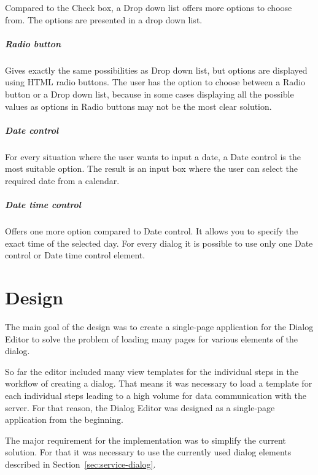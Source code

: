 Compared to the Check box, a Drop down list offers more options to choose from.
The options are presented in a drop down list.

\paragraph{Radio button}

Gives exactly the same possibilities as Drop down list, but options are
displayed using HTML radio buttons. The user has the option to choose
between a Radio button or a Drop down list, because in some cases displaying all
the possible values as options in Radio buttons may not be the most clear
solution.

\paragraph{Date control}

For every situation where the user wants to input a date, a Date control is
the most suitable option. The result is an input box where the user can
select the required date from a calendar.

\paragraph{Date time control}\label{subsub:datetime}

Offers one more option compared to Date control. It allows you to specify the
exact time of the selected day.
For every dialog it is possible to use only one Date control or
Date time control element.

\chapter{Design}\label{ch:design}

The main goal of the design was to create a single-page application for the
Dialog Editor to solve the problem of loading many pages for various elements
of the dialog.

So far the editor included many view templates for the individual steps in the
workflow of creating a dialog. That means it was necessary to load a template
for each individual steps leading to a high volume for data communication
with the server. For that reason, the Dialog Editor was designed as
a single-page application from the beginning.

The major requirement for the implementation was to simplify the current
solution. For that it was necessary to use the currently used dialog elements
described in Section~\ref{sec:service-dialog}.

